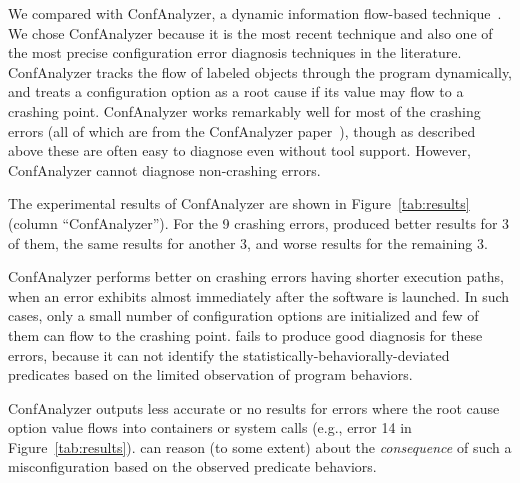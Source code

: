 We compared \ourtool with ConfAnalyzer, a dynamic information
flow-based technique~\cite{Rabkin:2011:PPC}.
We chose ConfAnalyzer because it is the most recent technique and
also one of the most precise configuration error diagnosis techniques
in the literature.
ConfAnalyzer tracks the flow of labeled objects through the
program dynamically,
and treats a configuration option as a root cause if its
value may flow to a crashing point.
ConfAnalyzer works remarkably well for most of the crashing errors (all of
which are from the ConfAnalyzer paper~\cite{Rabkin:2011:PPC}), though as
described above these are often easy to diagnose even without tool
support. However, ConfAnalyzer cannot diagnose non-crashing errors.

The experimental results of ConfAnalyzer are shown in
Figure~\ref{tab:results} (column ``ConfAnalyzer'').
For the 9 crashing errors, \ourtool produced better results for 3 of them,
the same results for another 3, and worse results for the remaining 3.

ConfAnalyzer performs better on crashing errors
having shorter execution paths, when an error exhibits
almost immediately after the software is launched.
In such cases, only a small number of configuration options are initialized and
few of them can flow to the crashing point. 
\ourtool fails to produce good diagnosis for these errors, because it can not identify
 the statistically-behaviorally-deviated predicates based on the limited
observation of program behaviors.

ConfAnalyzer outputs less accurate or no results
for errors where the root cause option value
flows into containers or system calls (e.g., error 14 in Figure~\ref{tab:results}).
\ourtool can reason (to some extent) about the \textit{consequence} of
such a misconfiguration based on the observed predicate behaviors.

